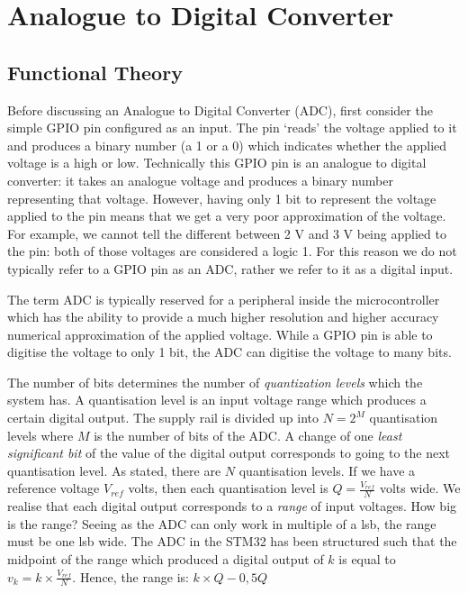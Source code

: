 \chapter{Analogue to Digital Converter}
\section{Functional Theory}
Before discussing an Analogue to Digital Converter (ADC), first consider the simple GPIO pin configured as an input. 
The pin `reads' the voltage applied to it and produces a binary number (a 1 or a 0) which indicates whether the applied voltage is a high or low. Technically this GPIO pin is an analogue to digital converter: it takes an analogue voltage and produces a binary number representing that voltage. 
However, having only 1 bit to represent the voltage applied to the pin means that we get a very poor approximation of the voltage. 
For example, we cannot tell the different between 2 V and 3 V being applied to the pin: both of those voltages are considered a logic 1. 
For this reason we do not typically refer to a GPIO pin as an ADC, rather we refer to it as a digital input.

The term ADC is typically reserved for a peripheral inside the microcontroller which has the ability to provide a much higher resolution and higher accuracy numerical approximation of the applied voltage. 
While a GPIO pin is able to digitise the voltage to only 1 bit, the ADC can digitise the voltage to many bits. 

The number of bits determines the number of \emph{quantization levels} which the system has. A quantisation level is an input voltage range which produces a certain digital output. The supply rail is divided up into \(N = 2^M\) quantisation levels where \(M\) is the number of bits of the ADC. 
A change of one \emph{least significant bit} of the value of the digital output corresponds to going to the next quantisation level. 
As stated, there are \(N\) quantisation levels. If we have a reference voltage \(V_{ref}\) volts, then each quantisation level is \(Q = \frac{V_{ref}}{N}\) volts wide.
We realise that each digital output corresponds to a \emph{range} of input voltages. How big is the range? Seeing as the ADC can only work in multiple of a lsb, the range must be one lsb wide. 
The ADC in the STM32 has been structured such that the midpoint of the range which produced a digital output of \(k\) is equal to \(v_{k} = k \times \frac{V_{ref}}{N}\). Hence, the range is: \(k \times Q - 0,5 Q\)

